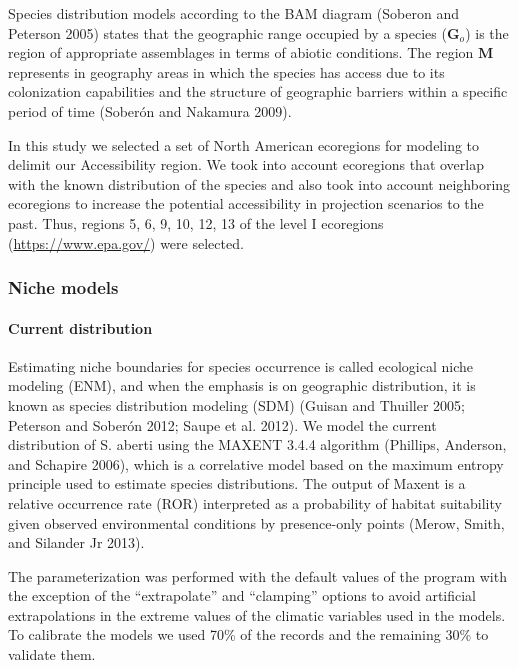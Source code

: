 \documentclass[
]{article}
\begin{document}
Species distribution models according to the BAM diagram (Soberon and
Peterson 2005) states that the geographic range occupied by a species
(\(\textbf{G}_o\)) is the region of appropriate assemblages in terms of
abiotic conditions. The region \(\textbf{M}\) represents in geography
areas in which the species has access due to its colonization
capabilities and the structure of geographic barriers within a specific
period of time (Soberón and Nakamura 2009).

In this study we selected a set of North American ecoregions for
modeling to delimit our Accessibility region. We took into account
ecoregions that overlap with the known distribution of the species and
also took into account neighboring ecoregions to increase the potential
accessibility in projection scenarios to the past. Thus, regions 5, 6,
9, 10, 12, 13 of the level I ecoregions (\url{https://www.epa.gov/})
were selected.

\hypertarget{niche-models}{%
\subsubsection{Niche models}\label{niche-models}}

\hypertarget{current-distribution}{%
\paragraph{Current distribution}\label{current-distribution}}

Estimating niche boundaries for species occurrence is called ecological
niche modeling (ENM), and when the emphasis is on geographic
distribution, it is known as species distribution modeling (SDM) (Guisan
and Thuiller 2005; Peterson and Soberón 2012; Saupe et al. 2012). We
model the current distribution of S. aberti using the MAXENT 3.4.4
algorithm (Phillips, Anderson, and Schapire 2006), which is a
correlative model based on the maximum entropy principle used to
estimate species distributions. The output of Maxent is a relative
occurrence rate (ROR) interpreted as a probability of habitat
suitability given observed environmental conditions by presence-only
points (Merow, Smith, and Silander Jr 2013).

The parameterization was performed with the default values of the
program with the exception of the ``extrapolate'' and ``clamping''
options to avoid artificial extrapolations in the extreme values of the
climatic variables used in the models. To calibrate the models we used
70\% of the records and the remaining 30\% to validate them.
\end{document}
